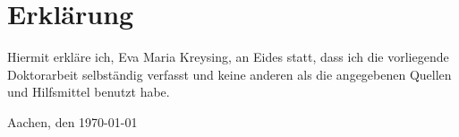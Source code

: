 
\chapter*{Erklärung}

 Hiermit erkläre ich, Eva Maria Kreysing, an Eides statt, dass ich die vorliegende Doktorarbeit selbständig verfasst und keine anderen als die angegebenen Quellen und Hilfsmittel benutzt habe.

	\vspace{3cm}

Aachen, den \today{}
